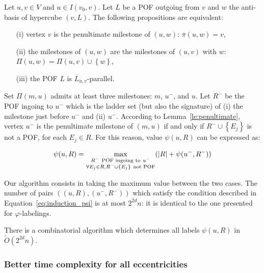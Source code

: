 \documentclass[a4paper,UKenglish,numberwithinsect,cleveref, autoref,anonymous]{lipics-v2021}
\newcommand{\set}[1]{\left\{ #1 \right\}}
\newcommand{\card}[1]{\left| #1 \right|}
\begin{document}
\begin{lemma}
Let $u,v \in V$ and $u \in I(v_0,v)$. Let $L$ be a POF outgoing from $v$ and $w$ the anti-basis of hypercube $(v,L)$. The following propositions are equivalent:
\begin{enumerate}
\item[(i)] vertex $v$ is the penultimate milestone of $(u,w)$: $\overline{\pi}(u,w) = v$,
\item[(ii)] the milestones of $(u,w)$ are the milestones of $(u,v)$ with $w$: $\Pi(u,w) = \Pi(u,v) \cup \set{w}$,
\item[(iii)] the POF $L$ is $\overline{L}_{u,v}$-parallel.
\end{enumerate}
\label{le:penultimate}
\end{lemma}

Set $\Pi(m,u)$ admits at least three milestones: $m$, $u^-$, and $u$. Let $R^-$ be the POF ingoing to $u^-$ which is the ladder set (but also the signature) of (i) the milestone just before $u^-$ and (ii) $u^-$. According to Lemma~\ref{le:penultimate}, vertex $u^-$ is the penultimate milestone of $(m,u)$ if and only if $R^- \cup \set{E_j}$ is not a POF, for each $E_j \in R$. For this reason, value $\psi(u,R)$ can be expressed as:

\begin{equation}
\psi(u,R) = \max\limits_{\substack{R^- ~\mbox{\scriptsize{POF ingoing to}}~ u^- \\ \forall E_j \in R, R^- \cup \set{E_j} ~\mbox{\scriptsize{not POF}}}} (\card{R} + \psi(u^-,R^-))
\label{eq:induction_psi}
\end{equation}

Our algorithm consists in taking the maximum value between the two cases. The number of pairs $((u,R),(u^-,R^-))$ which satisfy the condition described in Equation~\eqref{eq:induction_psi} is at most $2^{2d}n$: it is identical to the one presented for $\varphi$-labelings.

\begin{theorem}
There is a combinatorial algorithm which determines all labels $\psi(u,R)$ in $\tilde{O}(2^{2d}n)$. 
\label{th:compute_psi}
\end{theorem}

\subsubsection{Better time complexity for all eccentricities} \label{subsubsec:ecc}
\end{document}
